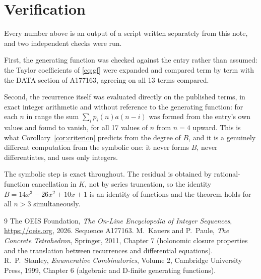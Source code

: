 \documentclass[11pt,a4paper]{article}
\theoremstyle{plain}
\theoremstyle{definition}
\begin{document}
\section{Verification}

Every number above is an output of a script written separately from this note, and two
independent checks were run.

First, the generating function was checked against the entry rather than assumed: the
Taylor coefficients of \eqref{eq:gf} were expanded and compared term by term with the DATA
section of A177163, agreeing on all 13 terms compared.

Second, the recurrence itself was evaluated directly on the published terms, in exact
integer arithmetic and without reference to the generating function: for each $n$ in range
the sum $\sum_{i}p_{i}(n)a(n-i)$ was formed from the entry's own values and found to
vanish, for all 17 values of $n$ from $n=4$ upward. This is what
Corollary~\ref{cor:criterion} predicts from the degree of $B$, and it is a genuinely
different computation from the symbolic one: it never forms $B$, never differentiates, and
uses only integers.

The symbolic step is exact throughout. The residual is obtained by rational-function
cancellation in $K$, not by series truncation, so the identity $B=14 x^{3} - 26 x^{2} + 10 x + 1$ is an
identity of functions and the theorem holds for all $n>3$ simultaneously.

\begin{thebibliography}{9}
 The OEIS Foundation, \emph{The On-Line Encyclopedia of Integer Sequences},
\url{https://oeis.org}, 2026. Sequence A177163.
 M.~Kauers and P.~Paule, \emph{The Concrete Tetrahedron}, Springer, 2011,
Chapter 7 (holonomic closure properties and the translation between recurrences and
differential equations).
 R.~P.~Stanley, \emph{Enumerative Combinatorics}, Volume 2, Cambridge
University Press, 1999, Chapter 6 (algebraic and D-finite generating functions).
\end{thebibliography}
\end{document}
